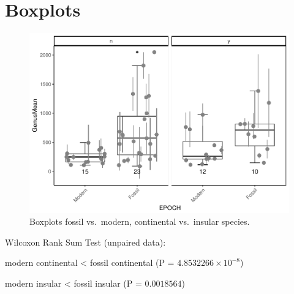 \section{Boxplots}


\begin{figure}[htbp]
	\centering
	\includegraphics{MA_JJ_files/figure-latex/BPFMCI-1.pdf}
	\caption{Boxplots fossil vs.~modern, continental vs.~insular species.}
	\label{BoxFoMCI}
\end{figure}


Wilcoxon Rank Sum Test (unpaired data):

modern continental \textless{} fossil continental (P =
\(4.8532266\times 10^{-8}\))

modern insular \textless{} fossil insular (P = \(0.0018564\))





